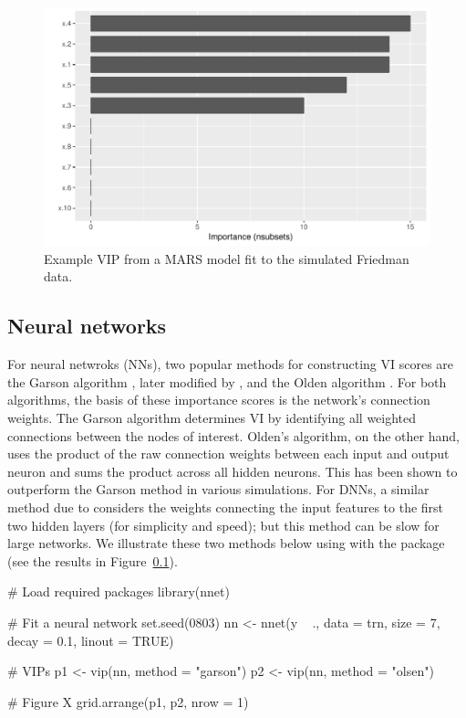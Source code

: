 \begin{figure}[!htb]
  \centering 
  \includegraphics[width=1\linewidth]{figures/vip-earth} 
  \caption{Example VIP from a MARS model fit to the simulated Friedman data.}
  \label{fig:vip-earth}
\end{figure}

\subsection{Neural networks}

For neural netwroks (NNs), two popular methods for constructing VI scores are the Garson algorithm \citep{interpreting-garson-1991}, later modified by \citet{back-goh-1995}, and the Olden algorithm \citep{accurate-olden-2004}. For both algorithms, the basis of these importance scores is the network’s connection weights. The Garson algorithm determines VI by identifying all weighted connections between the nodes of interest. Olden’s algorithm, on the other hand, uses the product of the raw connection weights between each input and output neuron and sums the product across all hidden neurons. This has been shown to outperform the Garson method in various simulations. For DNNs, a similar method due to \citet{data-gedeon-1997} considers the weights connecting the input features to the first two hidden layers (for simplicity and speed); but this method can be slow for large networks. We illustrate these two methods below using  with the  package \citep{nnet-pkg} (see the results in Figure~\ref{}).

\begin{example}
# Load required packages
library(nnet)

# Fit a neural network
set.seed(0803)
nn <- nnet(y ~ ., data = trn, size = 7, decay = 0.1, linout = TRUE)

# VIPs
p1 <- vip(nn, method = "garson")
p2 <- vip(nn, method = "olsen")

# Figure X
grid.arrange(p1, p2, nrow = 1)
\end{example}

